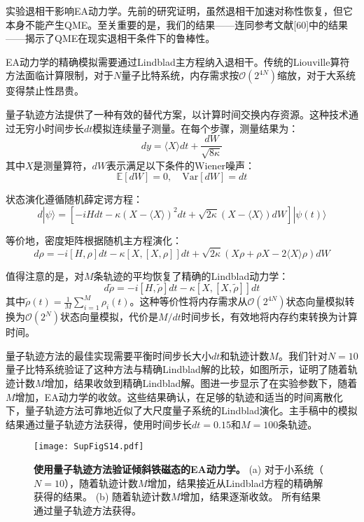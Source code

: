 \documentclass[11pt,a4paper]{article}
\begin{document}
实验退相干影响EA动力学。先前的研究证明，虽然退相干加速对称性恢复，但它本身不能产生QME。至关重要的是，我们的结果——连同参考文献[60]中的结果——揭示了QME在现实退相干条件下的鲁棒性。

EA动力学的精确模拟需要通过Lindblad主方程纳入退相干。传统的Liouville算符方法面临计算限制，对于$N$量子比特系统，内存需求按$\mathcal{O}(2^{4N})$缩放，对于大系统变得禁止性昂贵。

量子轨迹方法提供了一种有效的替代方案，以计算时间交换内存资源。这种技术通过无穷小时间步长$dt$模拟连续量子测量。在每个步骤，测量结果为：
\[
dy = \langle X\rangle dt + \frac{dW}{\sqrt{8\kappa}}
\]
其中$X$是测量算符，$dW$表示满足以下条件的Wiener噪声：
\[
\mathbb{E}[dW] = 0, \quad \text{Var}[dW] = dt
\]

状态演化遵循随机薛定谔方程：
\[
d|\psi\rangle = \left[-iHdt - \kappa(X-\langle X\rangle)^2 dt + \sqrt{2\kappa}(X-\langle X\rangle)dW\right]|\psi(t)\rangle
\]

等价地，密度矩阵根据随机主方程演化：
\[
d\rho = -i[H,\rho]dt - \kappa[X,[X,\rho]]dt + \sqrt{2\kappa}\left(X\rho + \rho X - 2\langle X\rangle\rho\right)dW
\]

值得注意的是，对$M$条轨迹的平均恢复了精确的Lindblad动力学：
\[
d\tilde{\rho} = -i[H,\tilde{\rho}]dt - \kappa[X,[X,\tilde{\rho}]]dt
\]
其中$\tilde{\rho}(t) = \frac{1}{M}\sum_{i=1}^{M}\rho_i(t)$。这种等价性将内存需求从$\mathcal{O}(2^{4N})$状态向量模拟转换为$\mathcal{O}(2^{N})$状态向量模拟，代价是$M/dt$时间步长，有效地将内存约束转换为计算时间。

量子轨迹方法的最佳实现需要平衡时间步长大小$dt$和轨迹计数$M$。我们针对$N=10$量子比特系统验证了这种方法与精确Lindblad解的比较，如图所示，证明了随着轨迹计数$M$增加，结果收敛到精确Lindblad解。图进一步显示了在实验参数下，随着$M$增加，EA动力学的收敛。这些结果确认，在足够的轨迹和适当的时间离散化下，量子轨迹方法可靠地近似了大尺度量子系统的Lindblad演化。主手稿中的模拟结果通过量子轨迹方法获得，使用时间步长$dt=0.15$和$M=100$条轨迹。

\begin{figure}[H]
    \centering
    \texttt{[image: SupFigS14.pdf]}
    \caption{
        \textbf{使用量子轨迹方法验证倾斜铁磁态的EA动力学。}
        (a) 对于小系统（$N=10$），随着轨迹计数$M$增加，结果接近从Lindblad方程的精确解获得的结果。
        (b) 随着轨迹计数$M$增加，结果逐渐收敛。
        所有结果通过量子轨迹方法获得。
    }
    \label{fig:quantum_trajectory_verification}
\end{figure}
\end{document}
